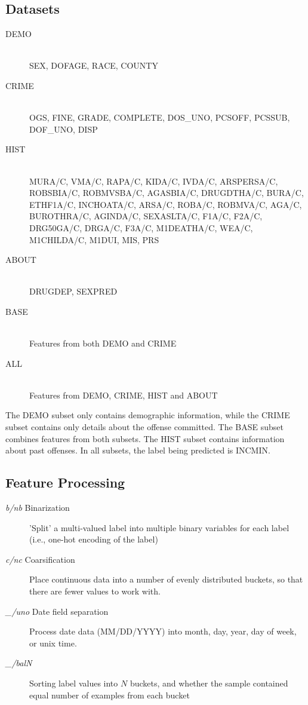 \documentclass[11pt,letter]{article}
\begin{document}
\subsection{Datasets}
\begin{description}
	\item [DEMO] \hfill \\SEX, DOFAGE, RACE, COUNTY
	\item [CRIME] \hfill \\OGS, FINE, GRADE, COMPLETE, DOS\_UNO, PCSOFF, PCSSUB, DOF\_UNO, DISP
	\item [HIST] \hfill \\MURA/C, VMA/C, RAPA/C, KIDA/C, IVDA/C, ARSPERSA/C, ROBSBIA/C, ROBMVSBA/C, AGASBIA/C, DRUGDTHA/C, BURA/C, ETHF1A/C, INCHOATA/C, ARSA/C, ROBA/C, ROBMVA/C, AGA/C, BUROTHRA/C, AGINDA/C, SEXASLTA/C, F1A/C, F2A/C, DRG50GA/C, DRGA/C, F3A/C, M1DEATHA/C, WEA/C, M1CHILDA/C, M1DUI, MIS, PRS
	\item [ABOUT] \hfill \\DRUGDEP, SEXPRED
	\item [BASE] \hfill \\Features from both DEMO and CRIME
	\item [ALL] \hfill \\Features from DEMO, CRIME, HIST and ABOUT
\end{description}
The DEMO subset only contains demographic information, while the CRIME subset contains only details about the offense committed. The BASE subset combines features from both subsets. The HIST subset contains information about past offenses. In all subsets, the label being predicted is INCMIN.

\subsection{Feature Processing}
\begin{description}
	\item [\emph{b/nb} Binarization] 'Split' a multi-valued label into multiple binary variables for each label (i.e., one-hot encoding of the label)
	\item [\emph{c/nc} Coarsification] Place continuous data into a number of evenly distributed buckets, so that there are fewer values to work with.
	\item [\emph{\_/uno} Date field separation] Process date data (MM/DD/YYYY) into month, day, year, day of week, or unix time.
	\item [\emph{\_/balN}] Sorting label values into $N$ buckets, and whether the sample contained equal number of examples from each bucket
\end{description}
\end{document}
